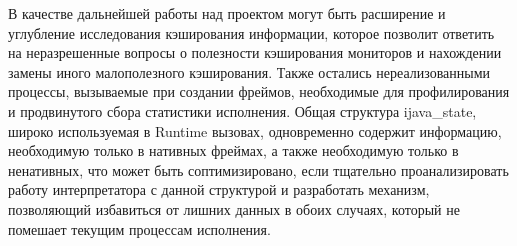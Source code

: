 В качестве дальнейшей работы над проектом могут быть расширение и углубление исследования кэширования информации, которое позволит ответить на неразрешенные вопросы о полезности кэширования мониторов и нахождении замены иного малополезного кэширования. Также остались нереализованными процессы, вызываемые при создании фреймов, необходимые для профилирования и продвинутого сбора статистики исполнения. Общая структура ijava\_state, широко используемая в Runtime вызовах, одновременно содержит информацию, необходимую только в нативных фреймах, а также необходимую только в ненативных, что может быть соптимизировано, если тщательно проанализировать работу интерпретатора с данной структурой и разработать механизм, позволяющий избавиться от лишних данных в обоих случаях, который не помешает текущим процессам исполнения.